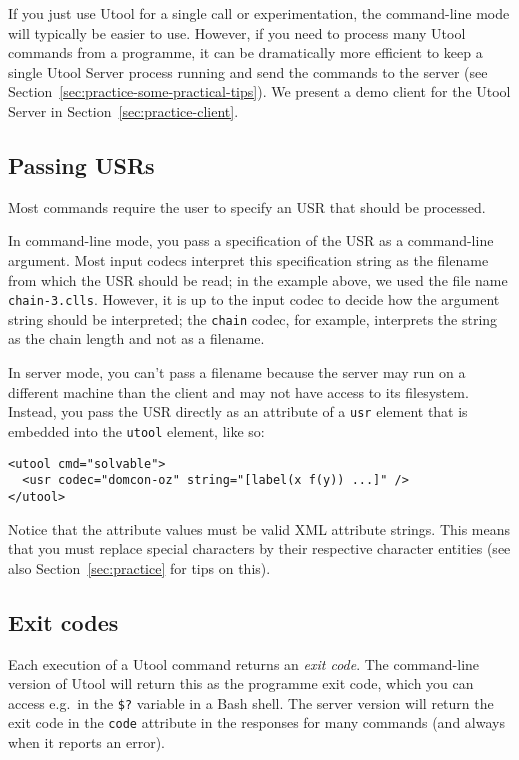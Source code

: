 If you just use Utool for a single call or experimentation, the
command-line mode will typically be easier to use. However, if you
need to process many Utool commands from a programme, it can be
dramatically more efficient to keep a single Utool Server process
running and send the commands to the server (see
Section~\ref{sec:practice-some-practical-tips}). We present a demo
client for the Utool Server in Section~\ref{sec:practice-client}.


\subsection{Passing USRs}

Most commands require the user to specify an USR that should be
processed.

In command-line mode, you pass a specification of the USR as a
command-line argument. Most input codecs interpret this specification
string as the filename from which the USR should be read; in the
example above, we used the file name \verb?chain-3.clls?. However, it
is up to the input codec to decide how the argument string should be
interpreted; the \verb?chain? codec, for example, interprets the
string as the chain length and not as a filename.

In server mode, you can't pass a filename because the server may run
on a different machine than the client and may not have access to its
filesystem. Instead, you pass the USR directly as an attribute of a
\verb?usr? element that is embedded into the \verb?utool? element,
like so:

\begin{verbatim}
<utool cmd="solvable">
  <usr codec="domcon-oz" string="[label(x f(y)) ...]" />
</utool>
\end{verbatim}

Notice that the attribute values must be valid XML attribute
strings. This means that you must replace special characters by
their respective character entities (see also
Section~\ref{sec:practice} for tips on this).


\subsection{Exit codes}

Each execution of a Utool command returns an \emph{exit code}. The
command-line version of Utool will return this as the programme exit
code, which you can access e.g.\ in the \texttt{\$?} variable in a
Bash shell. The server version will return the exit code in the
\verb?code? attribute in the responses for many commands (and always
when it reports an error).

